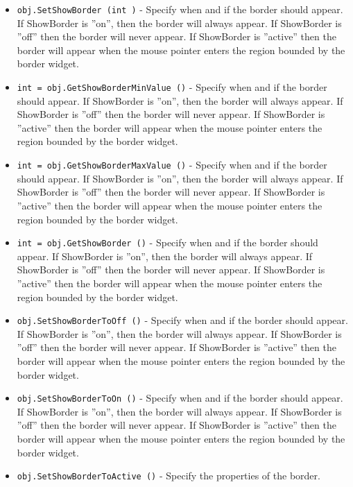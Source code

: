 \begin{itemize}
\item  \verb|obj.SetShowBorder (int )| -  Specify when and if the border should appear. If ShowBorder is ''on'',
 then the border will always appear. If ShowBorder is ''off'' then the
 border will never appear.  If ShowBorder is ''active'' then the border
 will appear when the mouse pointer enters the region bounded by the
 border widget.

\item  \verb|int = obj.GetShowBorderMinValue ()| -  Specify when and if the border should appear. If ShowBorder is ''on'',
 then the border will always appear. If ShowBorder is ''off'' then the
 border will never appear.  If ShowBorder is ''active'' then the border
 will appear when the mouse pointer enters the region bounded by the
 border widget.

\item  \verb|int = obj.GetShowBorderMaxValue ()| -  Specify when and if the border should appear. If ShowBorder is ''on'',
 then the border will always appear. If ShowBorder is ''off'' then the
 border will never appear.  If ShowBorder is ''active'' then the border
 will appear when the mouse pointer enters the region bounded by the
 border widget.

\item  \verb|int = obj.GetShowBorder ()| -  Specify when and if the border should appear. If ShowBorder is ''on'',
 then the border will always appear. If ShowBorder is ''off'' then the
 border will never appear.  If ShowBorder is ''active'' then the border
 will appear when the mouse pointer enters the region bounded by the
 border widget.

\item  \verb|obj.SetShowBorderToOff ()| -  Specify when and if the border should appear. If ShowBorder is ''on'',
 then the border will always appear. If ShowBorder is ''off'' then the
 border will never appear.  If ShowBorder is ''active'' then the border
 will appear when the mouse pointer enters the region bounded by the
 border widget.

\item  \verb|obj.SetShowBorderToOn ()| -  Specify when and if the border should appear. If ShowBorder is ''on'',
 then the border will always appear. If ShowBorder is ''off'' then the
 border will never appear.  If ShowBorder is ''active'' then the border
 will appear when the mouse pointer enters the region bounded by the
 border widget.

\item  \verb|obj.SetShowBorderToActive ()| -  Specify the properties of the border.


\end{itemize}
